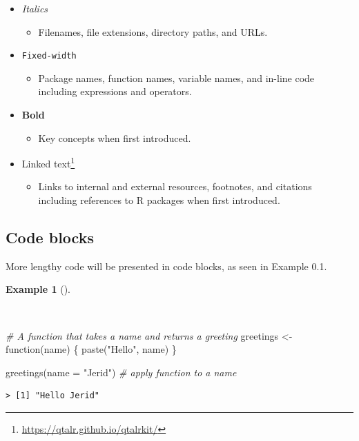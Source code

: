\documentclass[
  letterpaper,
  DIV=11,
  numbers=noendperiod]{scrreprt}
\newenvironment{Shaded}{\begin{snugshade}}{\end{snugshade}}
\newcommand{\AttributeTok}[1]{\textcolor[rgb]{0.00,0.00,0.00}{#1}}
\newcommand{\CommentTok}[1]{\textcolor[rgb]{0.00,0.00,0.00}{\textit{#1}}}
\newcommand{\ControlFlowTok}[1]{\textcolor[rgb]{0.00,0.00,0.00}{#1}}
\newcommand{\FunctionTok}[1]{\textcolor[rgb]{0.00,0.00,0.00}{#1}}
\newcommand{\NormalTok}[1]{\textcolor[rgb]{0.00,0.00,0.00}{#1}}
\newcommand{\OtherTok}[1]{\textcolor[rgb]{0.00,0.00,0.00}{#1}}
\newcommand{\StringTok}[1]{\textcolor[rgb]{0.00,0.00,0.00}{#1}}
\providecommand{\tightlist}{%
  \setlength{\itemsep}{0pt}\setlength{\parskip}{0pt}}\usepackage{longtable,booktabs,array}
\theoremstyle{definition}
\newtheorem{example}{Example}[chapter]
\theoremstyle{remark}
\DeclareRobustCommand{\href}[2]{#2\footnote{\url{#1}}}
\begin{document}
\begin{itemize}
\tightlist
\item
  \emph{Italics}

  \begin{itemize}
  \tightlist
  \item
    Filenames, file extensions, directory paths, and URLs.
  \end{itemize}
\item
  \texttt{Fixed-width}

  \begin{itemize}
  \tightlist
  \item
    Package names, function names, variable names, and in-line code
    including expressions and operators.
  \end{itemize}
\item
  \textbf{Bold}

  \begin{itemize}
  \tightlist
  \item
    Key concepts when first introduced.
  \end{itemize}
\item
  \href{https://qtalr.github.io/qtalrkit/}{Linked text}

  \begin{itemize}
  \tightlist
  \item
    Links to internal and external resources, footnotes, and citations
    including references to R packages when first introduced.
  \end{itemize}
\end{itemize}

\subsection*{Code blocks}\label{sec-p-code-blocks}

More lengthy code will be presented in code blocks, as seen in Example
0.1.

\begin{example}[]\protect\hypertarget{exm-code-block}{}\label{exm-code-block}

~

\begin{Shaded}
\begin{Highlighting}[]
\CommentTok{\# A function that takes a name and returns a greeting}
\NormalTok{greetings }\OtherTok{\textless{}{-}} \ControlFlowTok{function}\NormalTok{(name) \{}
  \FunctionTok{paste}\NormalTok{(}\StringTok{"Hello"}\NormalTok{, name)}
\NormalTok{\}}

\FunctionTok{greetings}\NormalTok{(}\AttributeTok{name =} \StringTok{"Jerid"}\NormalTok{) }\CommentTok{\# apply function to a name}
\end{Highlighting}
\end{Shaded}

\begin{verbatim}
> [1] "Hello Jerid"
\end{verbatim}

\end{example}
\end{document}
